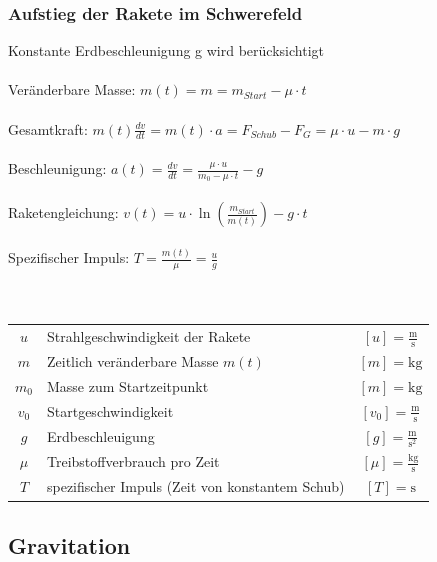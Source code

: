	\vfill\null
	\columnbreak
	
	
	\subsubsection{Aufstieg der Rakete im Schwerefeld}
	Konstante Erdbeschleunigung g wird berücksichtigt \\
	\\
	Veränderbare Masse: $m(t) = m = m_{Start} - \mu \cdot t$ \\
	\\
	Gesamtkraft: $m(t) \frac{dv}{dt} = m(t) \cdot a = F_{Schub} - F_G = \mu \cdot u - m \cdot g$ \\
	\\
	Beschleunigung: $a(t) = \frac{dv}{dt} = \frac{\mu \cdot u}{m_0 - \mu \cdot t} - g$ \\
	\\
	Raketengleichung: $v(t) = u \cdot \ln( \frac{m_{Start}}{m(t)} ) -  g \cdot t  $ \\
	\\
	Spezifischer Impuls: $T = \frac{m(t)}{\mu} = \frac{u}{g}$ \\
	\\
	\\
	\begin{tabular}{c l c}
	$u$ &  Strahlgeschwindigkeit der Rakete & $[u] =  \mathrm{\frac{m}{s}}$ \\	
	$m$ & Zeitlich veränderbare Masse $m(t)$ & $[m] = \mathrm{kg}$ \\
	$m_0$ & Masse zum Startzeitpunkt & $[m] = \mathrm{kg}$ \\
	$v_0$ & Startgeschwindigkeit & $[v_0] = \mathrm{\frac{m}{s}}$ \\
	$g$ & Erdbeschleuigung & $[g] = \mathrm{\frac{m}{s^2}}$ \\
	$\mu$ & Treibstoffverbrauch pro Zeit & $[\mu] = \mathrm{\frac{kg}{s}}$ \\
	$T$ & spezifischer Impuls (Zeit von konstantem Schub) & $[T] = \mathrm{s}$  \\
	\end{tabular}
	
	
	
	\subsection{Gravitation}
	
